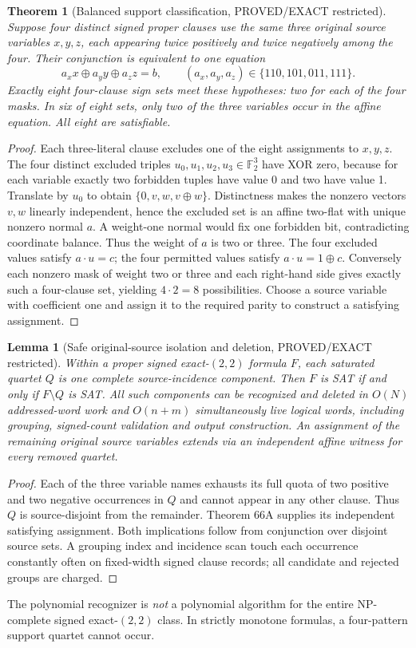 \documentclass[11pt]{article}
\newtheorem{theorem}{Theorem}
\newtheorem{lemma}{Lemma}
\begin{document}
\begin{theorem}[Balanced support classification, PROVED/EXACT restricted]
Suppose four \emph{distinct signed} proper clauses use the same three original source variables $x,y,z$, each appearing twice positively and twice negatively among the four. Their conjunction is equivalent to one equation
\[
a_xx\oplus a_yy\oplus a_zz=b,\qquad
(a_x,a_y,a_z)\in\{110,101,011,111\}.
\]
Exactly eight four-clause sign sets meet these hypotheses: two for each of the four masks. In six of eight sets, only \emph{two} of the three variables occur in the affine equation. All eight are satisfiable.
\end{theorem}
\begin{proof}
Each three-literal clause excludes one of the eight assignments to $x,y,z$. The four distinct excluded triples $u_0,u_1,u_2,u_3\in\mathbb F_2^3$ have XOR zero, because for each variable exactly two forbidden tuples have value 0 and two have value 1. Translate by $u_0$ to obtain $\{0,v,w,v\oplus w\}$. Distinctness makes the nonzero vectors $v,w$ linearly independent, hence the excluded set is an affine two-flat with unique nonzero normal $a$. A weight-one normal would fix one forbidden bit, contradicting coordinate balance. Thus the weight of $a$ is two or three. The four excluded values satisfy $a\cdot u=c$; the four permitted values satisfy $a\cdot u=1\oplus c$. Conversely each nonzero mask of weight two or three and each right-hand side gives exactly such a four-clause set, yielding $4\cdot2=8$ possibilities. Choose a source variable with coefficient one and assign it to the required parity to construct a satisfying assignment.
\end{proof}

\begin{lemma}[Safe original-source isolation and deletion, PROVED/EXACT restricted]
Within a proper signed exact-$(2,2)$ formula $F$, each saturated quartet $Q$ is one complete source-incidence component. Then $F$ is SAT if and only if $F\setminus Q$ is SAT. All such components can be recognized and deleted in $O(N)$ addressed-word work and $O(n+m)$ simultaneously live logical words, including grouping, signed-count validation and output construction. An assignment of the remaining original source variables extends via an independent affine witness for every removed quartet.
\end{lemma}
\begin{proof}
Each of the three variable names exhausts its full quota of two positive and two negative occurrences in $Q$ and cannot appear in any other clause. Thus $Q$ is source-disjoint from the remainder. Theorem 66A supplies its independent satisfying assignment. Both implications follow from conjunction over disjoint source sets. A grouping index and incidence scan touch each occurrence constantly often on fixed-width signed clause records; all candidate and rejected groups are charged.
\end{proof}
The polynomial recognizer is \emph{not} a polynomial algorithm for the entire NP-complete signed exact-$(2,2)$ class. In strictly monotone formulas, a four-pattern support quartet cannot occur.
\end{document}
